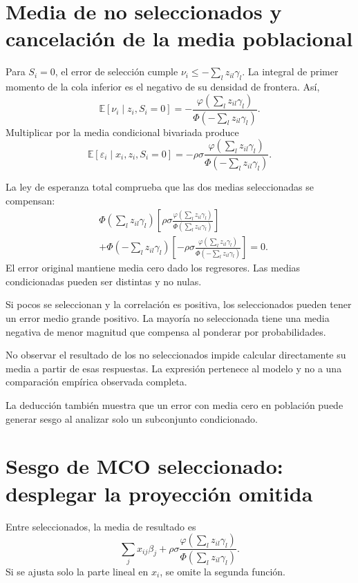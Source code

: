 \documentclass[11pt,a4paper]{article}
\newcommand{\E}{\mathbb E}
\begin{document}
\clearpage
\section{Media de no seleccionados y cancelación de la media poblacional}\label{unidad125}
Para \(S_i=0\), el error de selección
cumple \(\nu_i\le-\sum_lz_{il}\gamma_l\).
La integral de primer momento
de la cola inferior es
el negativo de su densidad de frontera.
Así,
\[
\E[\nu_i\mid z_i,S_i=0]
=-\frac{\varphi(\sum_lz_{il}\gamma_l)}
{\Phi(-\sum_lz_{il}\gamma_l)}.
\]
Multiplicar por la media condicional
bivariada produce
\[
\E[\varepsilon_i\mid x_i,z_i,S_i=0]
=-\rho\sigma
\frac{\varphi(\sum_lz_{il}\gamma_l)}
{\Phi(-\sum_lz_{il}\gamma_l)}.
\]

La ley de esperanza total
comprueba que las dos medias
seleccionadas se compensan:
\[
\begin{aligned}
&\Phi(\sum_lz_{il}\gamma_l)
\left[\rho\sigma\frac{\varphi(\sum_lz_{il}\gamma_l)}
{\Phi(\sum_lz_{il}\gamma_l)}\right]\\
&+\Phi(-\sum_lz_{il}\gamma_l)
\left[-\rho\sigma\frac{\varphi(\sum_lz_{il}\gamma_l)}
{\Phi(-\sum_lz_{il}\gamma_l)}\right]=0.
\end{aligned}
\]
El error original mantiene media cero
dado los regresores.
Las medias condicionadas pueden
ser distintas y no nulas.

\begin{ejemplo}
Si pocos se seleccionan y
la correlación es positiva,
los seleccionados pueden tener
un error medio grande positivo.
La mayoría no seleccionada
tiene una media negativa
de menor magnitud que
compensa al ponderar por probabilidades.
\end{ejemplo}
No observar el resultado de
los no seleccionados impide
calcular directamente su media
a partir de esas respuestas.
La expresión pertenece al modelo
y no a una comparación
empírica observada completa.

La deducción también muestra
que un error con media cero
en población puede generar
sesgo al analizar solo
un subconjunto condicionado.

\clearpage
\section{Sesgo de MCO seleccionado: desplegar la proyección omitida}\label{unidad126}
Entre seleccionados, la media de resultado es
\[
\sum_jx_{ij}\beta_j+
\rho\sigma\frac{\varphi(\sum_lz_{il}\gamma_l)}
{\Phi(\sum_lz_{il}\gamma_l)}.
\]
Si se ajusta solo la parte
lineal en \(x_i\), se omite
la segunda función.
\end{document}
